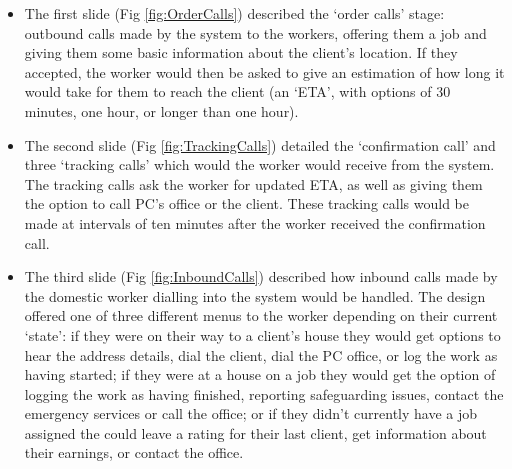 \begin{itemize}
    \item The first slide (Fig \ref{fig:OrderCalls}) described the `order calls' stage: outbound calls made by the system to the workers, offering them a job and giving them some basic information about the client's location. If they accepted, the worker would then be asked to give an estimation of how long it would take for them to reach the client (an `ETA', with options of 30 minutes, one hour, or longer than one hour).
    \item The second slide (Fig \ref{fig:TrackingCalls}) detailed the `confirmation call' and three `tracking calls' which would the worker would receive from the system. The tracking calls ask the worker for updated ETA, as well as giving them the option to call PC's office or the client. These tracking calls would  be made at intervals of ten minutes after the worker received the confirmation call. 
    \item The third slide (Fig \ref{fig:InboundCalls}) described how inbound calls made by the domestic worker dialling into the system would be handled. The design offered one of three different menus to the worker depending on their current `state': if they were on their way to a client's house they would get options to hear the address details, dial the client, dial the PC office, or log the work as having started; if they were at a house on a job they would get the option of logging the work as having finished, reporting safeguarding issues, contact the emergency services or call the office; or if they didn't currently have a job assigned the could leave a rating for their last client, get information about their earnings, or contact the office.
\end{itemize}

